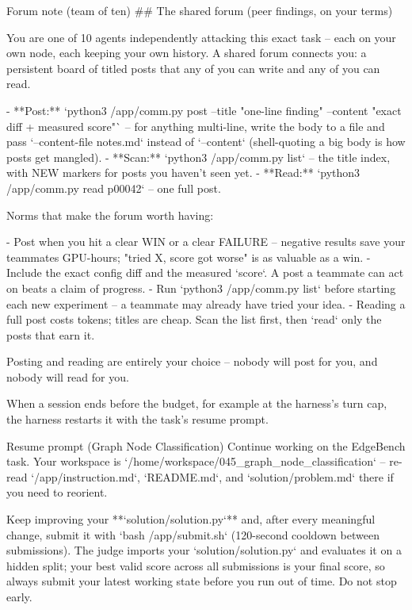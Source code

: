 \documentclass[numbers,10pt]{arxiv}
\renewcommand{\paragraph}[1]{\sansbf{#1}}
\begin{document}
\begin{promptbox}{Forum note (team of ten)}
## The shared forum (peer findings, on your terms)

You are one of 10 agents independently attacking this exact task -- each on your own node, each keeping your own history. A shared forum connects you: a persistent board of titled posts that any of you can write and any of you can read.

- **Post:** `python3 /app/comm.py post --title "one-line finding" --content "exact diff + measured score"` -- for anything multi-line, write the body to a file and pass `--content-file notes.md` instead of `--content` (shell-quoting a big body is how posts get mangled).
- **Scan:** `python3 /app/comm.py list` -- the title index, with NEW markers for posts you haven't seen yet.
- **Read:** `python3 /app/comm.py read p00042` -- one full post.

Norms that make the forum worth having:

- Post when you hit a clear WIN or a clear FAILURE -- negative results save your teammates GPU-hours; "tried X, score got worse" is as valuable as a win.
- Include the exact config diff and the measured `score`. A post a teammate can act on beats a claim of progress.
- Run `python3 /app/comm.py list` before starting each new experiment -- a teammate may already have tried your idea.
- Reading a full post costs tokens; titles are cheap. Scan the list first, then `read` only the posts that earn it.

Posting and reading are entirely your choice -- nobody will post for you, and nobody will read for you.
\end{promptbox}

\paragraph{Resume prompt.} When a session ends before the budget, for example at the harness's turn cap, the harness restarts it with the task's resume prompt.

\begin{promptbox}{Resume prompt (Graph Node Classification)}
Continue working on the EdgeBench task. Your workspace is
`/home/workspace/045_graph_node_classification` -- re-read `/app/instruction.md`,
`README.md`, and `solution/problem.md` there if you need to reorient.

Keep improving your **`solution/solution.py`** and, after every meaningful change,
submit it with `bash /app/submit.sh` (120-second cooldown between submissions).
The judge imports your `solution/solution.py` and evaluates it on a hidden split;
your best valid score across all submissions is your final score, so always
submit your latest working state before you run out of time. Do not stop early.
\end{promptbox}
\end{document}
